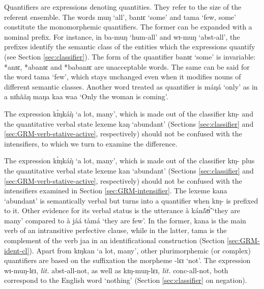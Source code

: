 \begin{exe}
\begin{exe}
\begin{exe}
{\begin{exe}
\begin{exe}
\begin{exe}
\begin{exe}
\begin{exe}
\begin{exe}
\begin{exe}
Quantifiers are expressions denoting quantities. They refer to the size of the
referent ensemble. The words {\sls muŋ} `all',   {\sls banɪɛ} `some' and {\sls 
tama}
`few, some' constitute the  monomorphemic quantifiers. The  former can be
expanded with a  nominal prefix. For instance, in {\sls ba-muŋ} `{\sc hum}-all'
and {\sls wɪ-muŋ} `{\sc abst}-all',  the prefixes identify the semantic class of
the entities which the expressions quantify (see Section \ref{sec:classifier}). 
The form of the quantifier {\sls banɪɛ} `some'  is  invariable: *{\sls anɪɛ}, 
*{\sls abanɪɛ} and *{\sls babanɪɛ} are unacceptable words.  The same can be 
said 
for the
word {\sls tama}
`few', which stays unchanged even  when it  modifies  nouns of different
semantic classes.  Another word treated as quantifier is {\sls máŋá} `only' as
in {\sls a nɪhããŋ maŋa kaa waa} `Only the woman is coming'.  



The 
expression {\sls kɪ̀ŋkáŋ̀} `a lot, many', which is made out of the  
classifier  {\sls kɪŋ-} and the quantitative verbal state lexeme {\sls kaŋ}  
`abundant'   (Sections  \ref{sec:classifier} and 
\ref{sec:GRM-verb-stative-active}, respectively) should not be confused with 
the 
intensifiers,  to which
we turn to examine the difference.

The expression {\sls kɪ̀ŋkáŋ̀} `a lot, many', which  is made out of the  
classifier  {\sls kɪŋ-} plus the quantitative verbal state lexeme {\sls kan}  
`abundant'   (Sections  \ref{sec:classifier} and 
\ref{sec:GRM-verb-stative-active}, respectively) should not be confused with 
the 
intensifiers  examined in Section \ref{sec:GRM-intensifier}.
The  lexeme {\sls kana} `abundant'  is semantically verbal but turns into a 
quantifier when {\sls kɪŋ-}  is prefixed to it.  Other evidence for its verbal 
status  is the utterance {\sls à kánã́ʊ̃́} `they are many' compared to {\sls 
à 
jáá tàmá} `they are few'.  In the former, {\sls kana} is the main verb of an 
intransitive perfective clause, while in the latter, {\sls tama} is the 
complement of the verb {\sls jaa} in an identificational construction  (Section 
\ref{sec:GRM-ident-cl}). Apart from {\sls  kɪŋkan}  `a lot, many',  other 
plurimorphemic (or complex) quantifiers are based on the suffixation the 
morpheme {\sls  -lɛɪ} `not'. The expression {\sls wɪ-muŋ-lɛɪ}, {\it lit.} {\sc 
abst}-all-not, as well as {\sls kɪŋ-muŋ-lɛɪ},  {\it lit.} {\sc conc}-all-not,  
both correspond to the English word `nothing' (Section \ref{sec:classifier} on 
negation).


\end{exe}
\end{exe}
\end{exe}
\end{exe}
\end{exe}
\end{exe}
\end{exe}}
\end{exe}
\end{exe}
\end{exe}
